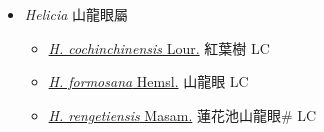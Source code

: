 
  \begin{itemize}
 \item[] \textit{Helicia} 山龍眼屬
                    
  \begin{itemize}
        \item[] \href{http://www.theplantlist.org/tpl1.1/search?q=Helicia+cochinchinensis}{\textit{H. cochinchinensis} Lour.}   紅葉樹 LC
        \item[] \href{http://www.theplantlist.org/tpl1.1/search?q=Helicia+formosana}{\textit{H. formosana} Hemsl.}   山龍眼 LC
        \item[] \href{http://www.theplantlist.org/tpl1.1/search?q=Helicia+rengetiensis}{\textit{H. rengetiensis} Masam.}   蓮花池山龍眼\# LC
  \end{itemize}
  \end{itemize}
